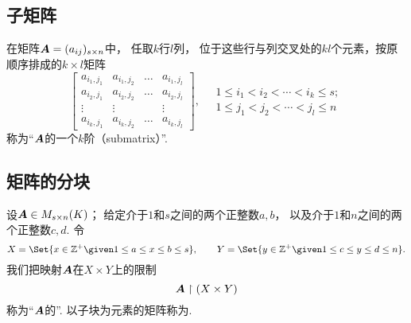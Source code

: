 \subsection{子矩阵}
\begin{definition}
在矩阵\(\boldsymbol{A}=(a_{ij})_{s \times n}\)中，
任取\(k\)行\(l\)列，
位于这些行与列交叉处的\(kl\)个元素，按原顺序排成的\(k \times l\)矩阵\begin{equation*}
	\begin{bmatrix}
		a_{i_1,j_1} & a_{i_1,j_2} & \dots & a_{i_1,j_l} \\
		a_{i_2,j_1} & a_{i_2,j_2} & \dots & a_{i_2,j_l} \\
		\vdots & \vdots & & \vdots \\
		a_{i_k,j_1} & a_{i_k,j_2} & \dots & a_{i_k,j_l}
	\end{bmatrix},
	\quad
	\begin{array}{c}
		1 \leq i_1 < i_2 < \dotsb < i_k \leq s; \\
		1 \leq j_1 < j_2 < \dotsb < j_l \leq n
	\end{array}
\end{equation*}称为“\(\boldsymbol{A}\)的一个\(k\)阶（submatrix）”.
\end{definition}

\subsection{矩阵的分块}
\begin{definition}
设\(\boldsymbol{A}\in M_{s \times n}(K)\)；
给定介于\(1\)和\(s\)之间的两个正整数\(a,b\)，
以及介于\(1\)和\(n\)之间的两个正整数\(c,d\).
令\begin{equation*}
	X=\Set{ x\in\mathbb{Z}^+ \given 1 \leq a \leq x \leq b \leq s },
	\qquad
	Y=\Set{ y\in\mathbb{Z}^+ \given 1 \leq c \leq y \leq d \leq n }.
\end{equation*}
我们把映射\(\boldsymbol{A}\)在\(X \times Y\)上的限制\begin{equation*}
	\boldsymbol{A}\upharpoonright(X \times Y)
\end{equation*}称为“\(\boldsymbol{A}\)的”.
以子块为元素的矩阵称为.
\end{definition}

